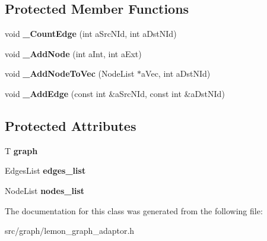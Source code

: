 \subsection*{Protected Member Functions}
\begin{DoxyCompactItemize}
\item 
\hypertarget{classall__distance__sketch_1_1graph_1_1GenericGraphBaseAdaptor_a3fd3bb65b5c4692265eda2f1d209c31e}{}void {\bfseries \+\_\+\+Count\+Edge} (int a\+Src\+N\+Id, int a\+Dst\+N\+Id)\label{classall__distance__sketch_1_1graph_1_1GenericGraphBaseAdaptor_a3fd3bb65b5c4692265eda2f1d209c31e}

\item 
\hypertarget{classall__distance__sketch_1_1graph_1_1GenericGraphBaseAdaptor_a9a11827402ab138d4a2bf924cd64731d}{}void {\bfseries \+\_\+\+Add\+Node} (int a\+Int, int a\+Ext)\label{classall__distance__sketch_1_1graph_1_1GenericGraphBaseAdaptor_a9a11827402ab138d4a2bf924cd64731d}

\item 
\hypertarget{classall__distance__sketch_1_1graph_1_1GenericGraphBaseAdaptor_aef5e864979be5faf9f6cfa9f5c5d9bb3}{}void {\bfseries \+\_\+\+Add\+Node\+To\+Vec} (Node\+List $\ast$a\+Vec, int a\+Dst\+N\+Id)\label{classall__distance__sketch_1_1graph_1_1GenericGraphBaseAdaptor_aef5e864979be5faf9f6cfa9f5c5d9bb3}

\item 
\hypertarget{classall__distance__sketch_1_1graph_1_1GenericGraphBaseAdaptor_ab4c290052b570926d0189925c1807537}{}void {\bfseries \+\_\+\+Add\+Edge} (const int \&a\+Src\+N\+Id, const int \&a\+Dst\+N\+Id)\label{classall__distance__sketch_1_1graph_1_1GenericGraphBaseAdaptor_ab4c290052b570926d0189925c1807537}

\end{DoxyCompactItemize}
\subsection*{Protected Attributes}
\begin{DoxyCompactItemize}
\item 
\hypertarget{classall__distance__sketch_1_1graph_1_1GenericGraphBaseAdaptor_a5c770a556f22a2795c4c39c0d45b0eac}{}T {\bfseries graph}\label{classall__distance__sketch_1_1graph_1_1GenericGraphBaseAdaptor_a5c770a556f22a2795c4c39c0d45b0eac}

\item 
\hypertarget{classall__distance__sketch_1_1graph_1_1GenericGraphBaseAdaptor_a5e535fec360e1089ba0ba3f1bebafded}{}Edges\+List {\bfseries edges\+\_\+list}\label{classall__distance__sketch_1_1graph_1_1GenericGraphBaseAdaptor_a5e535fec360e1089ba0ba3f1bebafded}

\item 
\hypertarget{classall__distance__sketch_1_1graph_1_1GenericGraphBaseAdaptor_a018672953bde12d88d74b691e50f3956}{}Node\+List {\bfseries nodes\+\_\+list}\label{classall__distance__sketch_1_1graph_1_1GenericGraphBaseAdaptor_a018672953bde12d88d74b691e50f3956}

\end{DoxyCompactItemize}


The documentation for this class was generated from the following file\+:\begin{DoxyCompactItemize}
\item 
src/graph/lemon\+\_\+graph\+\_\+adaptor.\+h\end{DoxyCompactItemize}
